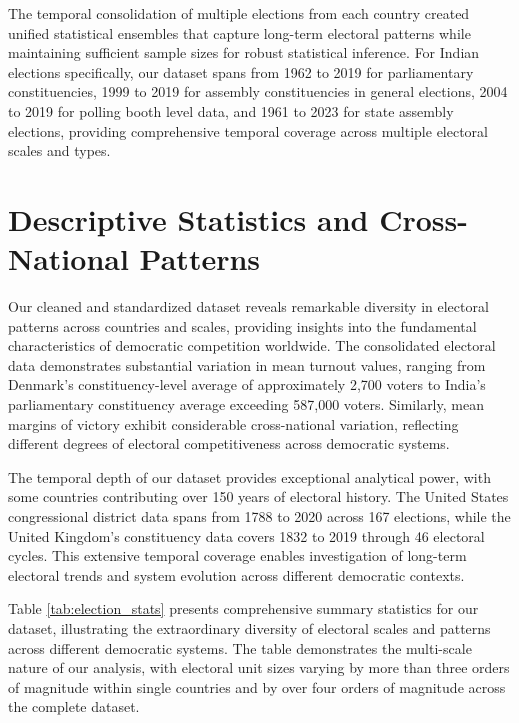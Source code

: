The temporal consolidation of multiple elections from each country created unified statistical ensembles that capture long-term electoral patterns while maintaining sufficient sample sizes for robust statistical inference. For Indian elections specifically, our dataset spans from 1962 to 2019 for parliamentary constituencies, 1999 to 2019 for assembly constituencies in general elections, 2004 to 2019 for polling booth level data, and 1961 to 2023 for state assembly elections, providing comprehensive temporal coverage across multiple electoral scales and types.

\section{Descriptive Statistics and Cross-National Patterns}

Our cleaned and standardized dataset reveals remarkable diversity in electoral patterns across countries and scales, providing insights into the fundamental characteristics of democratic competition worldwide. The consolidated electoral data demonstrates substantial variation in mean turnout values, ranging from Denmark's constituency-level average of approximately 2,700 voters to India's parliamentary constituency average exceeding 587,000 voters. Similarly, mean margins of victory exhibit considerable cross-national variation, reflecting different degrees of electoral competitiveness across democratic systems.

The temporal depth of our dataset provides exceptional analytical power, with some countries contributing over 150 years of electoral history. The United States congressional district data spans from 1788 to 2020 across 167 elections, while the United Kingdom's constituency data covers 1832 to 2019 through 46 electoral cycles. This extensive temporal coverage enables investigation of long-term electoral trends and system evolution across different democratic contexts.

Table \ref{tab:election_stats} presents comprehensive summary statistics for our dataset, illustrating the extraordinary diversity of electoral scales and patterns across different democratic systems. The table demonstrates the multi-scale nature of our analysis, with electoral unit sizes varying by more than three orders of magnitude within single countries and by over four orders of magnitude across the complete dataset.

